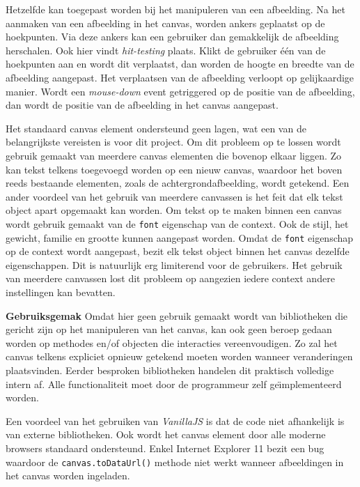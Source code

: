 Hetzelfde kan toegepast worden bij het manipuleren van een afbeelding. Na het aanmaken van een afbeelding in het canvas, worden ankers geplaatst op de hoekpunten. Via deze ankers kan een gebruiker dan gemakkelijk de afbeelding herschalen. Ook hier vindt \textit{hit-testing} plaats. Klikt de gebruiker \'{e}\'{e}n van de hoekpunten aan en wordt dit verplaatst, dan worden de hoogte en breedte van de afbeelding aangepast. Het verplaatsen van de afbeelding verloopt op gelijkaardige manier. Wordt een \textit{mouse-down} event getriggered op de positie van de afbeelding, dan wordt de positie van de afbeelding in het canvas aangepast. 


Het standaard canvas element ondersteund geen lagen, wat een van de belangrijkste vereisten is voor dit project. Om dit probleem op te lossen wordt gebruik gemaakt van meerdere canvas elementen die bovenop elkaar liggen. Zo kan tekst telkens toegevoegd worden op een nieuw canvas, waardoor het boven reeds bestaande elementen, zoals de achtergrondafbeelding, wordt getekend. Een ander voordeel van het gebruik van meerdere canvassen is het feit dat elk tekst object apart opgemaakt kan worden. Om tekst op te maken binnen een canvas wordt gebruik gemaakt van de \texttt{font} eigenschap van de context. Ook de stijl, het gewicht, familie en grootte kunnen aangepast worden. Omdat de \texttt{font} eigenschap op de context wordt aangepast, bezit elk tekst object binnen het canvas dezelfde eigenschappen. Dit is natuurlijk erg limiterend voor de gebruikers. Het gebruik van meerdere canvassen lost dit probleem op aangezien iedere context andere instellingen kan bevatten.  

\newpage
\textbf{Gebruiksgemak} \break
Omdat hier geen gebruik gemaakt wordt van bibliotheken die gericht zijn op het manipuleren van het canvas, kan ook geen beroep gedaan worden op methodes en/of objecten die interacties vereenvoudigen. Zo zal het canvas telkens expliciet opnieuw getekend moeten worden wanneer veranderingen plaatsvinden. Eerder besproken bibliotheken handelen dit praktisch volledige intern af. Alle functionaliteit moet door de programmeur zelf ge\"{\i}mplementeerd worden. 

Een voordeel van het gebruiken van \textit{VanillaJS} is dat de code niet afhankelijk is van externe bibliotheken. Ook wordt het canvas element door alle moderne browsers standaard ondersteund. Enkel Internet Explorer 11 bezit een bug waardoor de  \texttt{canvas.toDataUrl()} methode niet werkt wanneer afbeeldingen in het canvas worden ingeladen. %

